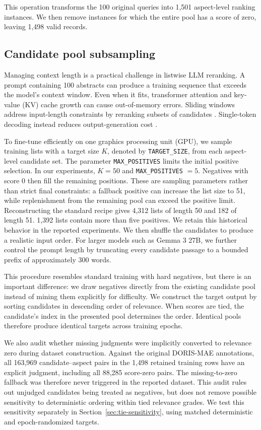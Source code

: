 \documentclass[pdflatex,sn-basic,Numbered]{sn-jnl}%
\theoremstyle{thmstyleone}%
\theoremstyle{thmstyletwo}%
\theoremstyle{thmstylethree}%
\begin{document}
This operation transforms the 100 original queries into 1,501 aspect-level ranking
instances. We then remove instances for which the entire pool has a score of zero,
leaving 1,498 valid records.

\subsection{Candidate pool subsampling}

Managing context length is a practical challenge in listwise LLM reranking. A
prompt containing 100 abstracts can produce a training sequence that exceeds the
model's context window. Even when it fits, transformer attention and key-value (KV) cache
growth can cause out-of-memory errors. Sliding windows address input-length
constraints by reranking subsets of candidates \cite{Sun}. Single-token decoding
instead reduces output-generation cost \cite{Reddy}.

To fine-tune efficiently on one graphics processing unit (GPU), we sample training lists with a target size
$K$, denoted by \texttt{TARGET\_SIZE}, from each aspect-level candidate set.
The parameter \texttt{MAX\_POSITIVES} limits the initial positive selection.
In our experiments, $K = 50$ and \texttt{MAX\_POSITIVES} $= 5$. Negatives with
score 0 then fill the remaining positions. These are sampling parameters rather
than strict final constraints: a fallback positive can increase the list size to
51, while replenishment from the remaining pool can exceed the positive limit.
Reconstructing the standard recipe gives 4,312 lists of length 50 and 182 of
length 51. 1,392 lists contain more than five positives. We retain this historical
behavior in the reported experiments. We then shuffle the candidates to produce a
realistic input order. For larger models such as Gemma 3 27B, we further control
the prompt length by truncating every candidate passage to a bounded prefix of
approximately 300 words.

This procedure resembles standard training with hard negatives, but there is an
important difference: we draw negatives directly from the existing candidate pool
instead of mining them explicitly for difficulty. We construct the target output by
sorting candidates in descending order of relevance. When scores are tied, the
candidate's index in the presented pool determines the order. Identical pools
therefore produce identical targets across training epochs.

We also audit whether missing judgments were implicitly converted to relevance
zero during dataset construction. Against the original DORIS-MAE annotations,
all 163,969 candidate--aspect pairs in the 1,498 retained training rows have an
explicit judgment, including all 88,285 score-zero pairs. The missing-to-zero
fallback was therefore never triggered in the reported dataset. This audit rules
out unjudged candidates being treated as negatives, but does not remove possible
sensitivity to deterministic ordering within tied relevance grades.
We test this sensitivity separately in Section~\ref{sec:tie-sensitivity}, using
matched deterministic and epoch-randomized targets.
\end{document}
